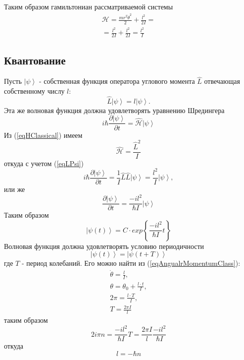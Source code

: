 Таким образом гамильтониан рассматриваемой системы
\begin{eqnarray}
\mathcal{H} = \frac{m r^2 \dot{\theta}^2 }{2} + \frac{l^2}{2 I} = 
\nonumber \\
= \frac{l^2}{2 I} + \frac{l^2}{2 I} = \frac{l^2}{I}
\label{eqHClassical}
\end{eqnarray}

\subsection{Квантование}

Пусть $\left|\psi\right>$ - собственная функция оператора углового
момента $\hat{L}$ отвечающая собственному числу $l$:
\begin{equation}
\hat{L} \left|\psi\right> = l \left|\psi\right>.
\label{eqLPsi}
\end{equation}
Эта же волновая функция должна удовлетворять уравнению Шредингера
\[
i \hbar \frac{\partial \left|\psi\right>}{ \partial t} = 
\hat { \mathcal{H} } \left|\psi\right>
\]
Из (\ref{eqHClassical}) имеем
\[
\hat { \mathcal{H} } = \frac{\hat{L}^2}{I}
\]
откуда с учетом (\ref{eqLPsi})
\[
i \hbar \frac{\partial \left|\psi\right>}{ \partial t} = 
\frac{1}{I} \hat{L} \hat{L} \left|\psi\right> = 
\frac{l^2}{I} \left|\psi\right>,
\]
или же
\[
\frac{\partial \left|\psi\right>}{ \partial t} = 
\frac{-i l^2}{\hbar I} \left|\psi\right>
\]
Таким образом
\[
\left|\psi\left(t \right)\right> = C \cdot exp\left\{\frac{-i l^2}{\hbar
    I} t
\right\}
\]
Волновая функция должна удовлетворять условию периодичности
\[
\left|\psi\left(t \right) \right>= \left|\psi\left(t + T \right)\right>
\]
где $T$ - период колебаний. Его можно найти из
(\ref{eqAngualrMomentumClass}):
\begin{eqnarray}
\dot{\theta} = \frac{l}{I},
\nonumber \\
\theta = \theta_0 + \frac{l \cdot t}{I},
\nonumber \\
2 \pi = \frac{l \cdot T}{I},
\nonumber \\
T = \frac{2 \pi I}{l}
\nonumber 
\end{eqnarray}
таким образом
\[
2 i \pi n = \frac{-i l^2}{\hbar I} T = 
\frac{2 \pi I}{l} \frac{-i l^2}{\hbar I}
\]
откуда
\[
l = -\hbar n
\]
